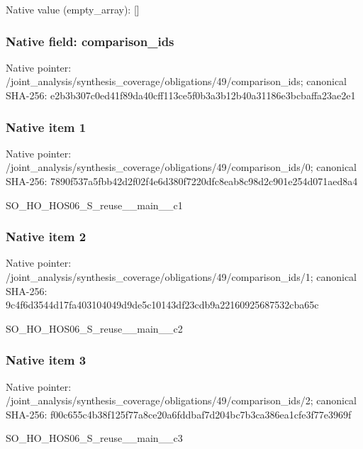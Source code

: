 \documentclass[10pt,a4paper]{article}
\begin{document}
Native value (empty\_\allowbreak{}array): []

\subsubsection{Native field: comparison\_\allowbreak{}ids}
Native pointer: /joint\_\allowbreak{}analysis/synthesis\_\allowbreak{}coverage/obligations/49/comparison\_\allowbreak{}ids; canonical SHA-256: e2b3b307c0ed41f89da40cff113ce5f0b3a3b12b40a31186e3bcbaffa23ae2e1

\subsubsection{Native item 1}
Native pointer: /joint\_\allowbreak{}analysis/synthesis\_\allowbreak{}coverage/obligations/49/comparison\_\allowbreak{}ids/0; canonical SHA-256: 7890f537a5fbb42d2f02f4e6d380f7220dfc8eab8c98d2c901e254d071aed8a4

\begingroup\raggedright\sloppy SO\_\allowbreak{}HO\_\allowbreak{}HOS06\_\allowbreak{}S\_\allowbreak{}reuse\_\allowbreak{}\_\allowbreak{}main\_\allowbreak{}\_\allowbreak{}c1\par\endgroup

\subsubsection{Native item 2}
Native pointer: /joint\_\allowbreak{}analysis/synthesis\_\allowbreak{}coverage/obligations/49/comparison\_\allowbreak{}ids/1; canonical SHA-256: 9c4f6d3544d17fa403104049d9de5c10143df23cdb9a22160925687532cba65c

\begingroup\raggedright\sloppy SO\_\allowbreak{}HO\_\allowbreak{}HOS06\_\allowbreak{}S\_\allowbreak{}reuse\_\allowbreak{}\_\allowbreak{}main\_\allowbreak{}\_\allowbreak{}c2\par\endgroup

\subsubsection{Native item 3}
Native pointer: /joint\_\allowbreak{}analysis/synthesis\_\allowbreak{}coverage/obligations/49/comparison\_\allowbreak{}ids/2; canonical SHA-256: f00c655c4b38f125f77a8ce20a6fddbaf7d204bc7b3ca386ea1cfe3f77e3969f

\begingroup\raggedright\sloppy SO\_\allowbreak{}HO\_\allowbreak{}HOS06\_\allowbreak{}S\_\allowbreak{}reuse\_\allowbreak{}\_\allowbreak{}main\_\allowbreak{}\_\allowbreak{}c3\par\endgroup
\end{document}
